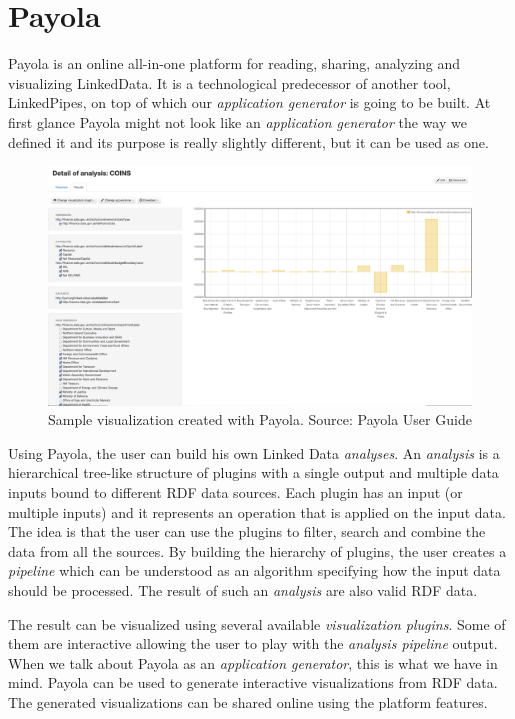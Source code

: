 \section{Payola}

Payola \cite{payola} is an online all-in-one platform for reading, sharing, analyzing and visualizing LinkedData. It is a technological predecessor of another tool, LinkedPipes, on top of which our \emph{application generator} is going to be built. At first glance Payola might not look like an \emph{application generator} the way we defined it and its purpose is really slightly different, but it can be used as one.

\begin{figure}
	\centering
	\includegraphics[width=150mm]{img/02_payola.png}
	\caption{Sample visualization created with Payola. Source: Payola User Guide \cite{payola_user_guide}} 
	\label{fig:payola-example}
\end{figure}

Using Payola, the user can build his own Linked Data \emph{analyses}. An \emph{analysis} is a hierarchical tree-like structure of plugins with a single output and multiple data inputs bound to different RDF data sources. Each plugin has an input (or multiple inputs) and it represents an operation that is applied on the input data. The idea is that the user can use the plugins to filter, search and combine the data from all the sources. By building the hierarchy of plugins, the user creates a \emph{pipeline} which can be understood as an algorithm specifying how the input data should be processed. The result of such an \emph{analysis} are also valid RDF data.

The result can be visualized using several available \emph{visualization plugins}. Some of them are interactive allowing the user to play with the \emph{analysis pipeline} output. When we talk about Payola as an \emph{application generator}, this is what we have in mind. Payola can be used to generate interactive visualizations from RDF data. The generated visualizations can be shared online using the platform features.


